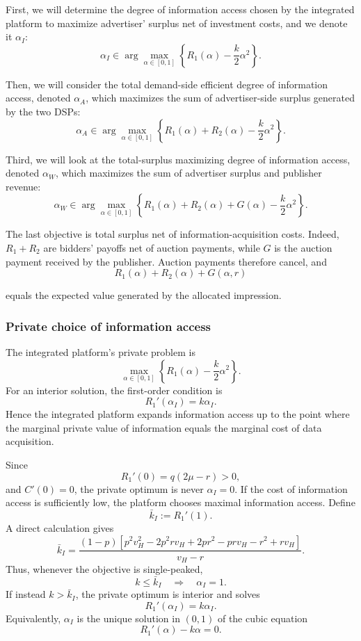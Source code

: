 \documentclass[11pt]{article}
\theoremstyle{plain}
\theoremstyle{definition}
\theoremstyle{plain}
\theoremstyle{plain}
\theoremstyle{plain}
\theoremstyle{plain}
\numberwithin{equation}{section}
\begin{document}
First, we will determine the degree of information access chosen by the integrated platform to maximize advertiser' surplus net of investment costs, and we denote it $ \alpha_I $:
\[
\alpha_I\in
\arg\max_{\alpha\in[0,1]}
\left\{
R_1(\alpha)-\frac{k}{2}\alpha^2
\right\}.
\]

\vspace{0.2cm}

\noindent Then, we will consider the total demand-side efficient degree of information access, denoted $\alpha_A$, which maximizes the sum of advertiser-side surplus generated by the two DSPs:
\[
\alpha_A\in
\arg\max_{\alpha\in[0,1]}
\left\{
R_1(\alpha)+R_2(\alpha)-\frac{k}{2}\alpha^2
\right\}.
\]

Third, we will look at the total-surplus maximizing degree of information access, denoted $ \alpha_W $, which maximizes the sum of advertiser surplus and publisher revenue:
\[
\alpha_W\in
\arg\max_{\alpha\in[0,1]}
\left\{
R_1(\alpha)+R_2(\alpha)+G(\alpha)-\frac{k}{2}\alpha^2
\right\}.
\]

\vspace{0.2cm}

\noindent The last objective is total surplus net of information-acquisition costs. Indeed, $ R_1+R_2 $ are bidders' payoffs net of auction payments, while $G$ is the auction payment received by the publisher. Auction payments therefore cancel, and
\[
 R_1(\alpha) + R_2(\alpha) + G(\alpha,r)
\]


\noindent equals the expected value generated by the allocated impression.

\subsubsection{Private choice of information access}

The integrated platform's private problem is
\[
\max_{\alpha\in[0,1]}
\left\{
R_1(\alpha)-\frac{k}{2}\alpha^2
\right\}.
\]
For an interior solution, the first-order condition is
\[
R_1'(\alpha_I)=k\alpha_I.
\]
Hence the integrated platform expands information access up to the point where the marginal
private value of information equals the marginal cost of data acquisition.

Since
\[
R_1'(0)=q(2\mu-r)>0,
\]
and $C'(0)=0$, the private optimum is never $\alpha_I=0$. If the cost of information access is
sufficiently low, the platform chooses maximal information access. Define
\[
\bar k_I:=R_1'(1).
\]
A direct calculation gives
\[
\bar k_I
=
\frac{
(1-p)
\left[
p^2v_H^2
-2p^2rv_H
+2pr^2
-prv_H
-r^2
+rv_H
\right]
}{
v_H-r
}.
\]
Thus, whenever the objective is single-peaked,
\[
k\le \bar k_I
\quad\Longrightarrow\quad
\alpha_I=1.
\]
If instead $k>\bar k_I$, the private optimum is interior and solves
\[
R_1'(\alpha_I)=k\alpha_I.
\]
Equivalently, $\alpha_I$ is the unique solution in $(0,1)$ of the cubic equation
\[
R_1'(\alpha)-k\alpha=0.
\]
\end{document}
